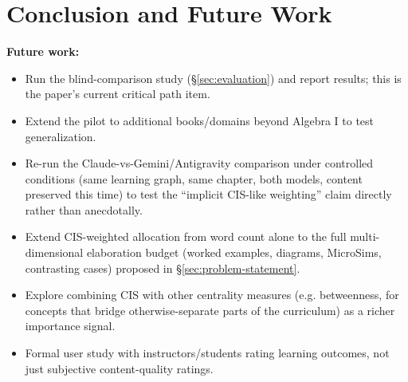 
\section{Conclusion and Future Work}
\label{sec:conclusion}


\textbf{Future work:}
\begin{itemize}
    \item Run the blind-comparison study (\S\ref{sec:evaluation}) and report
          results; this is the paper's current critical path item.
    \item Extend the pilot to additional books/domains beyond Algebra I to test
          generalization.
    \item Re-run the Claude-vs-Gemini/Antigravity comparison under controlled
          conditions (same learning graph, same chapter, both models, content
          preserved this time) to test the ``implicit CIS-like weighting'' claim
          directly rather than anecdotally.
    \item Extend CIS-weighted allocation from word count alone to the full
          multi-dimensional elaboration budget (worked examples, diagrams,
          MicroSims, contrasting cases) proposed in \S\ref{sec:problem-statement}.
    \item Explore combining CIS with other centrality measures (e.g. betweenness,
          for concepts that bridge otherwise-separate parts of the curriculum)
          as a richer importance signal.
    \item Formal user study with instructors/students rating learning outcomes,
          not just subjective content-quality ratings.
\end{itemize}
